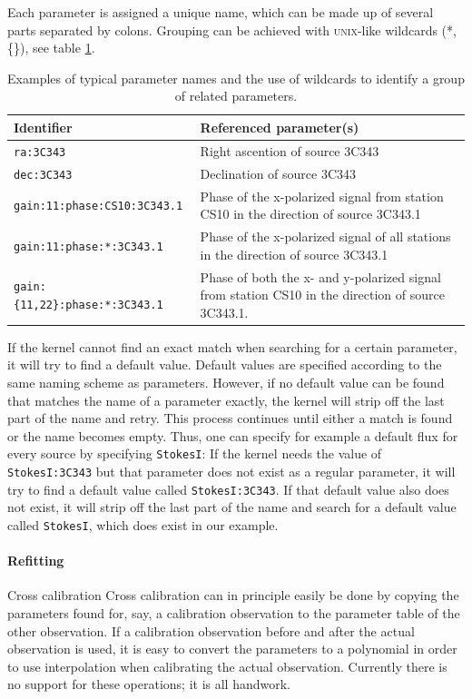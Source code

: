 \documentclass[10pt]{lofar}
\begin{document}
Each parameter is assigned a unique name, which can be made up of several parts separated by colons. Grouping can be achieved with \textsc{unix}-like wildcards (*, \{\}), see table \ref{tab:naming_scheme}.
\begin{table}[htb!]
\centering
\begin{tabular}{lp{}}
\hline
\textbf{Identifier} & \textbf{Referenced parameter(s)} \\
\hline
\texttt{ra:3C343} & Right ascention of source 3C343 \\
\hline
\texttt{dec:3C343} & Declination of source 3C343 \\
\hline
\texttt{gain:11:phase:CS10:3C343.1} & Phase of the x-polarized signal from station CS10 in the direction of source 3C343.1 \\
\hline
\texttt{gain:11:phase:*:3C343.1} & Phase of the x-polarized signal of all stations in the direction of source 3C343.1 \\
\hline
\texttt{gain:\{11,22\}:phase:*:3C343.1} & Phase of both the x- and y-polarized signal from station CS10 in the direction of source 3C343.1. \\
\hline
\end{tabular}
\caption{Examples of typical parameter names and the use of wildcards to identify a group of related parameters.}
\label{tab:naming_scheme}
\end{table}
If the kernel cannot find an exact match when searching for a certain parameter, it will try to find a default value. Default values are specified according to the same naming scheme as parameters. However, if no default value can be found that matches the name of a parameter exactly, the kernel will strip off the last part of the name and retry. This process continues until either a match is found or the name becomes empty. Thus, one can specify for example a default flux for every source by specifying \texttt{StokesI}: If the kernel needs the value of \texttt{StokesI:3C343} but that parameter does not exist as a regular parameter, it will try to find a default value called \texttt{StokesI:3C343}. If that default value also does not exist, it will strip off the last part of the name and search for a default value called \texttt{StokesI}, which does exist in our example.

\paragraph{Refitting}
Cross calibration
Cross calibration can in principle easily be done by copying the parameters found for, say, a calibration observation to the parameter table of the other observation. If a calibration observation before and after the actual observation is used, it is easy to convert the parameters to a polynomial in order to use interpolation when calibrating the actual observation.
Currently there is no support for these operations; it is all handwork.
\end{document}
